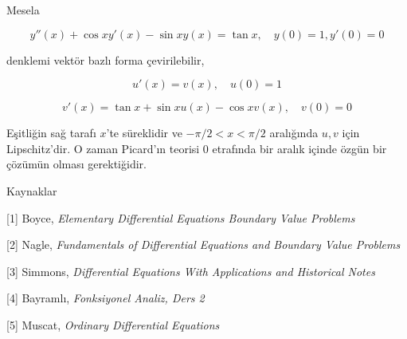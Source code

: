 \documentclass[12pt,fleqn]{article}\usepackage{../../common}
\begin{document}
Mesela

$$
y''(x) + \cos xy'(x) - \sin x y(x) = \tan x, \quad y(0)=1, y'(0)=0
$$

denklemi vektör bazlı forma çevirilebilir,

$$
u'(x) = v(x), \quad u(0)=1
$$

$$
v'(x) = \tan x + \sin x u(x) - \cos x v(x), \quad v(0) = 0
$$

Eşitliğin sağ tarafı $x$'te süreklidir ve $-\pi/2 < x < \pi / 2$ aralığında $u,v$
için Lipschitz'dir. O zaman Picard'ın teorisi 0 etrafında bir aralık içinde
özgün bir çözümün olması gerektiğidir.


Kaynaklar

[1] Boyce, {\em Elementary Differential Equations Boundary Value Problems}

[2] Nagle, {\em Fundamentals of Differential Equations and Boundary Value Problems}

[3] Simmons, {\em Differential Equations With Applications and Historical Notes}

[4] Bayramlı, {\em Fonksiyonel Analiz, Ders 2}

[5] Muscat, {\em Ordinary Differential Equations}
\end{document}

